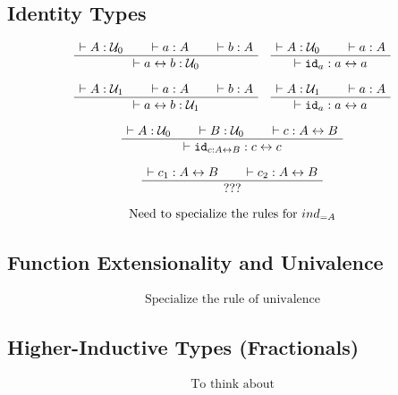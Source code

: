 \documentclass[format=acmlarge,review,natbib]{acmart}
\newcommand{\idc}{\mathtt{id}}
\newcommand{\iso}{\leftrightarrow}
\newcommand{\uzero}{\mathcal{U}_0}
\newcommand{\uone}{\mathcal{U}_1}
\newcommand{\proves}{\vdash}
\newcommand{\jdg}[3]{#1 \proves #2 : #3}
\begin{document}
\subsection{Identity Types}

\[
  \begin{array}{c}
    \AxiomC{$\jdg{}{A}{\uzero}$}
    \AxiomC{$\jdg{}{a}{A}$}
    \AxiomC{$\jdg{}{b}{A}$}
    \TrinaryInfC{$\jdg{}{a \iso b}{\uzero}$}
    \DisplayProof
    \quad
    \AxiomC{$\jdg{}{A}{\uzero}$}
    \AxiomC{$\jdg{}{a}{A}$}
    \BinaryInfC{$\jdg{}{\idc_{a}}{a \iso a}$}
    \DisplayProof
    \\
    \\
    \AxiomC{$\jdg{}{A}{\uone}$}
    \AxiomC{$\jdg{}{a}{A}$}
    \AxiomC{$\jdg{}{b}{A}$}
    \TrinaryInfC{$\jdg{}{a \iso b}{\uone}$}
    \DisplayProof
    \quad
    \AxiomC{$\jdg{}{A}{\uone}$}
    \AxiomC{$\jdg{}{a}{A}$}
    \BinaryInfC{$\jdg{}{\idc_{a}}{a \iso a}$}
    \DisplayProof
    \\
    \\
    \AxiomC{$\jdg{}{A}{\uzero}$}
    \AxiomC{$\jdg{}{B}{\uzero}$}
    \AxiomC{$\jdg{}{c}{A \iso B}$}
    \TrinaryInfC{$\jdg{}{\idc_{c:A\iso B}}{c \iso c}$}
    \DisplayProof
    \\
    \\
    \AxiomC{$\jdg{}{c_1}{A \iso B}$}
    \AxiomC{$\jdg{}{c_2}{A \iso B}$}
    \BinaryInfC{$???$}
    \DisplayProof
    \\
    \\
    \mbox{Need to specialize the rules for } ind_{=A}
  \end{array}
\]

\subsection{Function Extensionality and Univalence}

\[
  \begin{array}{c}
    \mbox{Specialize the rule of univalence}
  \end{array}
\]

\subsection{Higher-Inductive Types (Fractionals)}

\[
  \begin{array}{c}
    \mbox{To think about}
  \end{array}
\]


{\footnotesize

}
\end{document}
